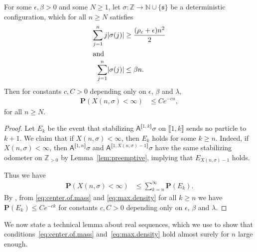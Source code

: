\documentclass[ECP]{ejpecp} %
\begin{document}
\begin{proposition}%
\label{prop:right.avalanche}
For some $\epsilon ,\beta >0$ and some $N\geq 1$, let
$\sigma \colon \mathbb{Z}\to \mathbb{N}\cup \{\mathfrak{s}\}$ be a deterministic
configuration, which for all $n \ge N$ satisfies
%
\begin{align}
\sum _{j=1}^{n} j\mathopen{\lvert }\sigma (j)\mathclose{\rvert } &\geq
\frac{(\rho _{c}+\epsilon )n^{2}}{2}
\label{eq:center.of.mass}
\\
\intertext{and} \sum _{j=1}^{n}\mathopen{\lvert }\sigma (j)\mathclose{\rvert }&\leq \beta n.
\label{eq:max.density}
\end{align}
%
Then for constants $c,C>0$ depending only on $\epsilon $, $\beta $ and
$\lambda $,
%
\begin{align*}
\mathbf{P}(X(n, \sigma )<\infty ) &\leq Ce^{-cn},
\end{align*}
%
for all $n \ge N$.
\end{proposition}
%
\begin{proof}
Let $E_{k}$ be the event that stabilizing
$\mathsf{A}^{\mathopen{\llbracket }1,k \mathclose{\rrbracket }}\sigma $ on $\mathopen{\llbracket }1,k \mathclose{\rrbracket }$ sends no particle to
$k+1$. We claim that if $X(n, \sigma )<\infty $, then $E_{k}$ holds for
some $k\geq n$. Indeed, if $X(n, \sigma )<\infty $, then
$\mathsf{A}^{\mathopen{\llbracket }1,n \mathclose{\rrbracket }}\sigma $ and
$\mathsf{A}^{\mathopen{\llbracket }1, X(n, \sigma )-1\mathclose{\rrbracket }}\sigma $ have the same stabilizing
odometer on $\mathbb{Z}_{>0}$ by Lemma~\ref{lem:preemptive}, implying that
$E_{X(n, \sigma )-1}$ holds.

Thus we have
%
\begin{align*}
\mathbf{P}(X(n, \sigma )<\infty ) &\leq \sum _{k=n}^{\infty}
\mathbf{P}(E_{k}).
\end{align*}
%
By \cite[Proposition~4.1]{cutoff}, from \eqref{eq:center.of.mass} and
\eqref{eq:max.density} for all $k\geq n$ we have
$\mathbf{P}(E_{k})\leq Ce^{-ck}$ for constants $c,C>0$ depending only on
$\epsilon $, $\beta $ and $\lambda $.
\end{proof}

We now state a technical lemma about real sequences, which we use to show
that conditions~\eqref{eq:center.of.mass} and~\eqref{eq:max.density} hold
almost surely for $n$ large enough.
\end{document}
